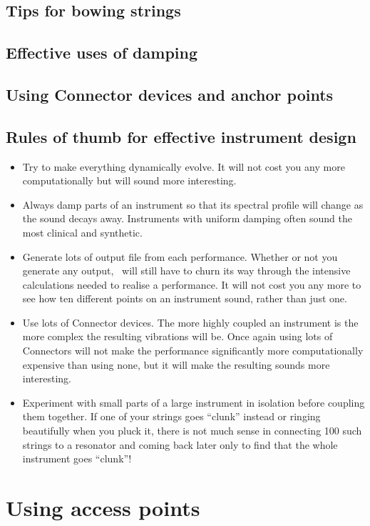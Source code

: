 \subsection{Tips for bowing strings}
\subsection{Effective uses of damping}
\subsection{Using Connector devices and anchor points}
\subsection{Rules of thumb for effective instrument design}
\begin{itemize}
\item Try to make everything dynamically evolve. It will not
cost you any more computationally but will sound more 
interesting.
\item Always damp parts of an instrument so that its spectral
profile will change as the sound decays away. Instruments
with uniform damping often sound the most clinical and
synthetic.
\item Generate lots of output file from each performance. 
Whether or not you generate any output, \tao\ will still
have to churn its way through the intensive calculations
needed to realise a performance. It will not cost you any more
to see how ten different points on an instrument sound, rather
than just one.
\item Use lots of Connector devices. The more highly coupled
an instrument is the more complex the resulting vibrations will
be. Once again using lots of Connectors will not make the 
performance significantly more computationally expensive than
using none, but it will make the resulting sounds more
interesting.
\item Experiment with small parts of a large instrument in isolation
before coupling them together. If one of your strings goes ``clunk''
instead or ringing beautifully when you pluck it, there is not much
sense in connecting 100 such strings to a resonator and coming
back later only to find that the whole instrument goes ``clunk''!
\end{itemize}



\section{Using access points}
